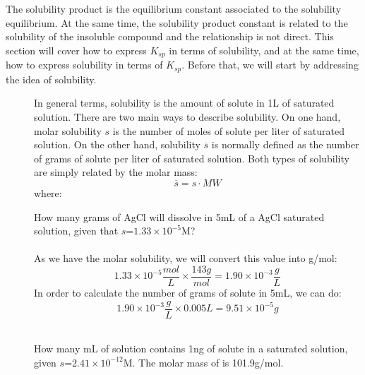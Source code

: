 \documentclass[main.tex]{subfiles}
\newcommand\chapterlabel{soluble}
\begin{document}
\section{}
The solubility product is the equilibrium constant associated to the solubility equilibrium. At the same time, the solubility product constant is related to the solubility of the insoluble compound and the relationship is not direct. This section will cover how to express $K_{sp}$ in terms of solubility, and at the same time, how to express solubility in terms of $K_{sp}$. Before that, we will start by addressing the idea of solubility.
\sloppy\begin{description}
\item[] In general terms, solubility is the amount of solute in 1L of saturated solution. There are two main ways to describe solubility. On one hand, molar solubility $s$ is the number of moles of solute per liter of saturated solution. On the other hand, solubility $\overline{s}$ is normally defined as the number of grams of solute per liter of saturated solution. Both types of solubility are simply related by the molar mass:
\begin{equation}
\boxed{ \overline{s}= s\cdot MW  }\label{\chapterlabel:equation1}
\end{equation}
where:
\begin{example} %
How many grams of AgCl will dissolve in 5mL of a AgCl saturated solution, given that $s$=$1.33\times 10^{-5}$M?
\\
\\
As we have the molar solubility, we will convert this value into g/mol:
\[1.33\times 10^{-5}\frac{mol}{L}\times \frac{143g}{mol}=1.90\times 10^{-3}\frac{g}{L}	 \]
In order to calculate the number of grams of solute in 5mL, we can do:
\[1.90\times 10^{-3}\frac{g}{L}\times 0.005L=9.51\times 10^{-5} g	 \]

\faDiamond\ \\
How many mL of solution contains 1ng of solute in a saturated  solution, given $s$=$2.41\times 10^{-12}$M. The molar mass of is  101.9g/mol.
\end{example}%


\end{description}
\end{document}
